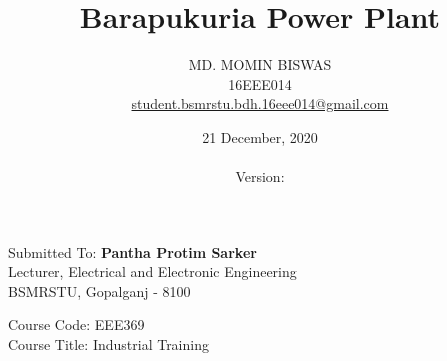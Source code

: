 \documentclass[11 pt]{article}
\title{\textcolor{Firebrick4}{\textbf{Barapukuria Power Plant}}}
\author
{
	MD. MOMIN BISWAS\\
	16EEE014\\
	\href{mailto:student.bsmrstu.bdh.16eee014@gmail.com}{\textcolor{DeepSkyBlue4}{student.bsmrstu.bdh.16eee014@gmail.com}}
}
\date{21 December, 2020 \\ \currenttime \\ Version: \version}
\affil{Department of EEE, BSMRSTU}
\begin{document}
\pagecolor{Green2}
\maketitle

\pagebreak

\pagecolor{white}

\begin{center}
	Submitted To: \textbf{{\Large Pantha Protim Sarker}}\\
	Lecturer, Electrical and Electronic Engineering\\
	BSMRSTU, Gopalganj - 8100\\
\end{center}

\vspace{15 mm}

Course Code: EEE369\\
Course Title: Industrial Training

\pagebreak

\tableofcontents
\listoffigures

\pagebreak
\end{document}
